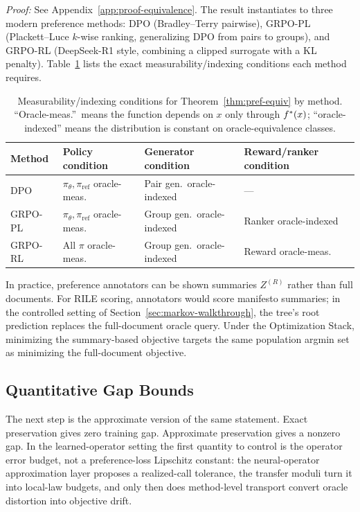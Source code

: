 \noindent\textit{Proof:} See Appendix~\ref{app:proof-equivalence}. The result instantiates to three modern preference methods: DPO (Bradley--Terry pairwise), GRPO-PL (Plackett--Luce $k$-wise ranking, generalizing DPO from pairs to groups), and GRPO-RL (DeepSeek-R1 style, combining a clipped surrogate with a KL penalty). Table~\ref{tab:measurability} lists the exact measurability/indexing conditions each method requires.
\begin{table}[htbp]
\centering\small
\begin{tabular}{llll}
\toprule
Method & Policy condition & Generator condition & Reward/ranker condition \\
\midrule
DPO & $\pi_\theta, \pi_{\mathrm{ref}}$ oracle-meas.\ & Pair gen.\ oracle-indexed & --- \\
GRPO-PL & $\pi_\theta, \pi_{\mathrm{ref}}$ oracle-meas.\ & Group gen.\ oracle-indexed & Ranker oracle-indexed \\
GRPO-RL & All $\pi$ oracle-meas.\ & Group gen.\ oracle-indexed & Reward oracle-meas.\ \\
\bottomrule
\end{tabular}
\caption{Measurability/indexing conditions for Theorem~\ref{thm:pref-equiv} by method. ``Oracle-meas.''\ means the function depends on $x$ only through $f^\ast(x)$; ``oracle-indexed'' means the distribution is constant on oracle-equivalence classes.}
\label{tab:measurability}
\end{table}

In practice, preference annotators can be shown summaries $Z^{(R)}$ rather than full documents. For RILE scoring, annotators would score manifesto summaries; in the controlled setting of Section~\ref{sec:markov-walkthrough}, the tree's root prediction replaces the full-document oracle query. Under the Optimization Stack, minimizing the summary-based objective targets the same population argmin set as minimizing the full-document objective.

\subsection{Quantitative Gap Bounds}

The next step is the approximate version of the same statement. Exact preservation gives zero training gap. Approximate preservation gives a nonzero gap. In the learned-operator setting the first quantity to control is the operator error budget, not a preference-loss Lipschitz constant: the neural-operator approximation layer proposes a realized-call tolerance, the transfer moduli turn it into local-law budgets, and only then does method-level transport convert oracle distortion into objective drift.

